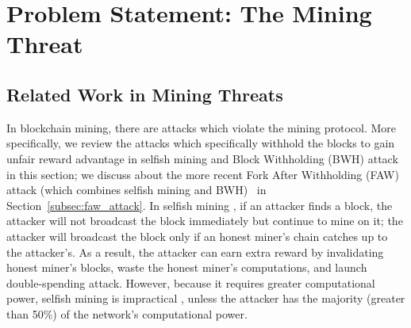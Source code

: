 \section{Problem Statement: The Mining Threat}
\label{sec:threat}

\subsection{Related Work in Mining Threats} %
\label{subsec:related_work}
In blockchain mining, there are attacks which violate the mining protocol.
More specifically, we review the attacks which specifically withhold the blocks to gain unfair reward advantage
in selfish mining and Block Withholding (BWH) attack in this section;
we discuss about the more recent Fork After Withholding (FAW) attack (which combines selfish mining and BWH)~\cite{b4} in Section~\ref{subsec:faw_attack}. 
In selfish mining \cite{b8}, 
if an attacker finds a block, the attacker will not broadcast the block immediately but continue to mine on it;
the attacker will broadcast the block only if an honest miner's chain catches up to the attacker's. 
As a result, the attacker can earn extra reward by invalidating honest miner's blocks, waste the honest miner's computations, 
and launch double-spending attack. %
However, because it requires greater computational power, %
selfish mining is impractical \cite{b9}, \cite{b10}
unless the attacker has the majority (greater than 50\%) of the network's computational power.

